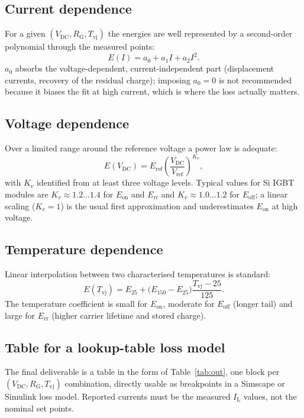 \documentclass[11pt,a4paper]{article}
\newcommand{\Eon}{E_{\mathrm{on}}}
\newcommand{\Eoff}{E_{\mathrm{off}}}
\newcommand{\Err}{E_{\mathrm{rr}}}
\newcommand{\Vdc}{V_{\mathrm{DC}}}
\newcommand{\IL}{I_{\mathrm{L}}}
\begin{document}
\subsection{Current dependence}

For a given $(\Vdc, R_{\mathrm{G}}, T_{\mathrm{vj}})$ the energies are well represented by
a second-order polynomial through the measured points:
\begin{equation}
E(I) = a_0 + a_1 I + a_2 I^2 .
\end{equation}
$a_0$ absorbs the voltage-dependent, current-independent part (displacement currents,
recovery of the residual charge); imposing $a_0=0$ is not recommended because it biases
the fit at high current, which is where the loss actually matters.

\subsection{Voltage dependence}

Over a limited range around the reference voltage a power law is adequate:
\begin{equation}
E(\Vdc)=E_{\mathrm{ref}}\left(\frac{\Vdc}{V_{\mathrm{ref}}}\right)^{K_v},
\end{equation}
with $K_v$ identified from at least three voltage levels. Typical values for Si IGBT
modules are $K_v\approx1.2\ldots1.4$ for $\Eon$ and $\Err$ and $K_v\approx1.0\ldots1.2$
for $\Eoff$; a linear scaling ($K_v=1$) is the usual first approximation and
underestimates $\Eon$ at high voltage.

\subsection{Temperature dependence}

Linear interpolation between two characterised temperatures is standard:
\begin{equation}
E(T_{\mathrm{vj}})=E_{25}+\big(E_{150}-E_{25}\big)\frac{T_{\mathrm{vj}}-25}{125}.
\end{equation}
The temperature coefficient is small for $\Eon$, moderate for $\Eoff$ (longer tail) and
large for $\Err$ (higher carrier lifetime and stored charge).

\subsection{Table for a lookup-table loss model}

The final deliverable is a table in the form of Table~\ref{tab:out}, one block per
$(\Vdc, R_{\mathrm{G}}, T_{\mathrm{vj}})$ combination, directly usable as breakpoints in
a Simscape or Simulink loss model. Reported currents must be the measured $\IL$ values,
not the nominal set points.
\end{document}
